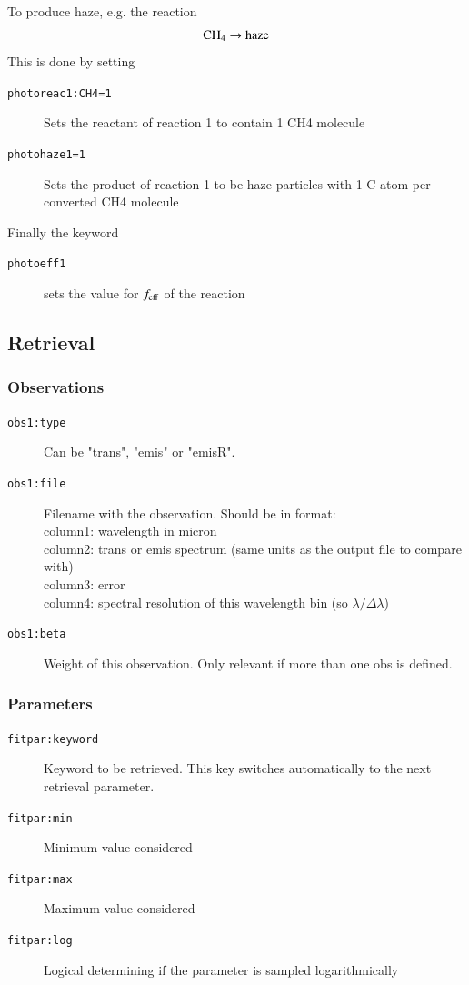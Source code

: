 \documentclass[12pt]{article}
\begin{document}
To produce haze, e.g. the reaction
\begin{equation}
\rm CH_4 \rightarrow haze
\end{equation}
This is done by setting
\begin{description}
\item[\texttt{photoreac1:CH4=1}]
Sets the reactant of reaction 1 to contain 1 CH4 molecule
\item[\texttt{photohaze1=1}]
Sets the product of reaction 1 to be haze particles with 1 C atom per converted CH4 molecule
\end{description}

Finally the keyword
\begin{description}
\item[\texttt{photoeff1}] sets the value for $f_{\rm eff}$ of the reaction
\end{description}

\subsection{Retrieval}

\subsubsection{Observations}

\begin{description}
\item[\texttt{obs1:type}]
Can be "trans", "emis" or "emisR".
\item[\texttt{obs1:file}]
Filename with the observation. Should be in format:\\
column1: wavelength in micron\\
column2: trans or emis spectrum (same units as the output file to compare with)\\
column3: error\\
column4: spectral resolution of this wavelength bin (so $\lambda/\Delta\lambda$)
\item[\texttt{obs1:beta}]
Weight of this observation. Only relevant if more than one obs is defined.
\end{description}

\subsubsection{Parameters}

\begin{description}
\item[\texttt{fitpar:keyword}]
Keyword to be retrieved. This key switches automatically to the next retrieval parameter.
\item[\texttt{fitpar:min}]
Minimum value considered
\item[\texttt{fitpar:max}]
Maximum value considered
\item[\texttt{fitpar:log}]
Logical determining if the parameter is sampled logarithmically
\end{description}
\end{document}
